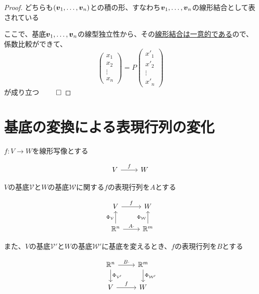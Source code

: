 \documentclass[../../../topic_linear-algebra]{subfiles}
\begin{document}
\begin{proof}
  どちらも$(\vb*{v}_1, \ldots, \vb*{v}_n)$との積の形、すなわち$\vb*{v}_1, \ldots, \vb*{v}_n$の線形結合として表されている

  ここで、基底$\vb*{v}_1, \ldots, \vb*{v}_n$の線型独立性から、その\hyperref[thm:lin-indep-iff-unique-lincomb]{線形結合は一意的である}ので、係数比較ができて、
  \begin{equation*}
    \begin{pmatrix}
      x_1    \\
      x_2    \\
      \vdots \\
      x_n
    \end{pmatrix} = P \begin{pmatrix}
      x'_1   \\
      x'_2   \\
      \vdots \\
      x'_n
    \end{pmatrix}
  \end{equation*}
  が成り立つ $\qed$
\end{proof}

\sectionline
\section{基底の変換による表現行列の変化}

$f\colon V \to W$を線形写像とする

\begin{equation*}
  \begin{tikzcd}
    V \arrow[r,"f"] & W
  \end{tikzcd}
\end{equation*}

$V$の基底$\mathcal{V}$と$W$の基底$\mathcal{W}$に関する$f$の表現行列を$A$とする

\begin{equation*}
  \begin{tikzcd}
    V \arrow[r,"f"] & W \\
    \mathbb{R}^n \arrow[u,"{\Phi_{\mathcal{V}}}"] \arrow[r,"A\cdot"] & \mathbb{R}^m \arrow[u,"{\Phi_{\mathcal{W}}}"]
  \end{tikzcd}
\end{equation*}

また、$V$の基底$\mathcal{V}'$と$W$の基底$\mathcal{W}'$に基底を変えるとき、$f$の表現行列を$B$とする

\begin{equation*}
  \begin{tikzcd}
    \mathbb{R}^n \arrow[d,"{\Phi_{\mathcal{V}'}}"] \arrow[r,"B\cdot"] & \mathbb{R}^m \arrow[d,"{\Phi_{\mathcal{W}'}}"] \\
    V \arrow[r,"f"] & W
  \end{tikzcd}
\end{equation*}
\end{document}
